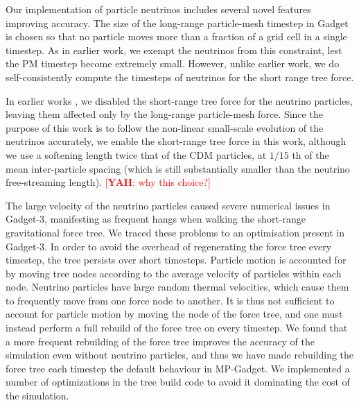 \documentclass[useAMS, usenatbib]{mnras}
\newcommand{\yah}[1]{{\textcolor{red}{[{\bf YAH}: #1]}}}
\begin{document}
Our implementation of particle neutrinos includes several novel features improving accuracy. The size of the long-range particle-mesh timestep in Gadget is chosen so that no particle moves more than a fraction of a grid cell in a single timestep. As in earlier work, we exempt the neutrinos from this constraint, lest the PM timestep become extremely small. However, unlike earlier work, we do self-consistently compute the timesteps of neutrinos for the short range tree force. 

In earlier works \citep{Bird_2012}, we disabled the short-range tree force for the neutrino particles, leaving them affected only by the long-range particle-mesh force. Since the purpose of this work is to follow the non-linear small-scale evolution of the neutrinos accurately, we enable the short-range tree force in this work, although we use a softening length
twice that of the CDM particles, at $1/15$ th of the mean inter-particle spacing (which is still substantially smaller than the neutrino free-streaming length). \yah{why this choice?}

The large velocity of the neutrino particles caused severe numerical issues in Gadget-3, manifesting as frequent hangs when walking the short-range gravitational force tree. We traced these problems to an optimisation present in Gadget-3. In order to avoid the overhead of regenerating the force tree every timestep, the tree persists over short timesteps. Particle motion is accounted for by moving tree nodes according to the average velocity of particles within each node. Neutrino particles have large random thermal velocities, which cause them to frequently move from one force node to another. It is thus not sufficient to account for particle motion by moving the node of the force tree, and one must instead perform a full rebuild of the force tree on every timestep. We found that a more frequent rebuilding of the force tree improves the accuracy of the simulation even without neutrino particles, and thus we have made rebuilding the force tree each timestep the default behaviour in MP-Gadget. We implemented a number of optimizations in the tree build code to avoid it dominating the cost of the simulation.
\end{document}
